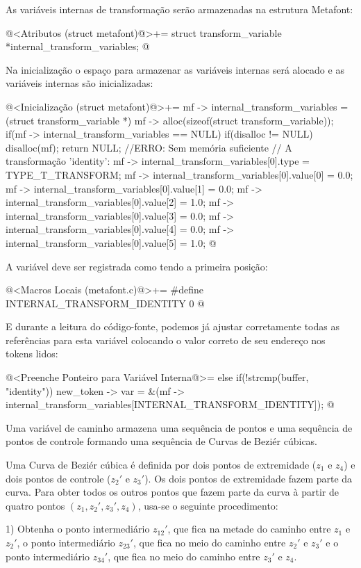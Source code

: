 As variáveis internas de transformação serão armazenadas na estrutura
Metafont:

\iniciocodigo
@<Atributos (struct metafont)@>+=
struct transform_variable *internal_transform_variables;
@
\fimcodigo

Na inicialização o espaço para armazenar as variáveis internas será
alocado e as variáveis internas são inicializadas:

\iniciocodigo
@<Inicialização (struct metafont)@>+=
mf -> internal_transform_variables =
  (struct transform_variable *)
    mf -> alloc(sizeof(struct transform_variable));
if(mf -> internal_transform_variables == NULL){
  if(disalloc != NULL)
    disalloc(mf);
  return NULL; //ERRO: Sem memória suficiente
}
// A transformação 'identity':
mf -> internal_transform_variables[0].type = TYPE_T_TRANSFORM;
mf -> internal_transform_variables[0].value[0] = 0.0;
mf -> internal_transform_variables[0].value[1] = 0.0;
mf -> internal_transform_variables[0].value[2] = 1.0;
mf -> internal_transform_variables[0].value[3] = 0.0;
mf -> internal_transform_variables[0].value[4] = 0.0;
mf -> internal_transform_variables[0].value[5] = 1.0;
@
\fimcodigo

A variável  deve ser registrada como tendo a
primeira posição:

\iniciocodigo
@<Macros Locais (metafont.c)@>+=
#define INTERNAL_TRANSFORM_IDENTITY 0
@
\fimcodigo

E durante a leitura do código-fonte, podemos já ajustar corretamente
todas as referências para esta variável colocando o valor correto de
seu endereço nos tokens lidos:

\iniciocodigo
@<Preenche Ponteiro para Variável Interna@>=
else if(!strcmp(buffer, "identity"))
  new_token -> var =
          &(mf -> internal_transform_variables[INTERNAL_TRANSFORM_IDENTITY]);
@
\fimcodigo


Uma variável de caminho armazena uma sequência de pontos e uma
sequência de pontos de controle formando uma sequência de Curvas de
Beziér cúbicas.

Uma Curva de Beziér cúbica é definida por dois pontos de extremidade
($z_1$ e $z_4$) e dois pontos de controle ($z_2'$ e $z_3'$). Os dois
pontos de extremidade fazem parte da curva. Para obter todos os outros
pontos que fazem parte da curva à partir de quatro pontos $(z_1, z_2',
z_3', z_4)$, usa-se o seguinte procedimento:

1) Obtenha o ponto intermediário $z_{12}'$, que fica na metade do
caminho entre $z_1$ e $z_2'$, o ponto intermediário $z_{23}'$, que
fica no meio do caminho entre $z_2'$ e $z_3'$ e o ponto intermediário
$z_{34}'$, que fica no meio do caminho entre $z_3'$ e $z_4$.

